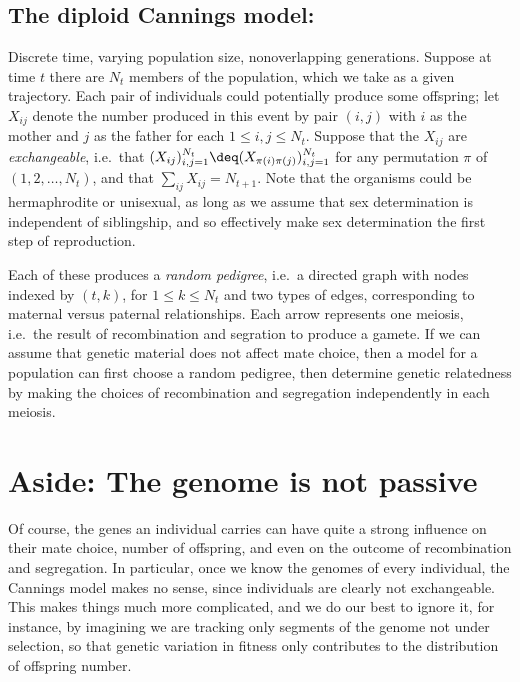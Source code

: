 \subsection{The diploid Cannings model:}
Discrete time, varying population size, nonoverlapping generations.
Suppose at time $t$ there are $N_t$ members of the population,
which we take as a given trajectory.
Each pair of individuals could potentially produce some offspring;
let $X_{ij}$ denote the number produced in this event by pair $(i,j)$ with $i$ as the mother and $j$ as the father for each $1 \le i,j \le N_{t}$.
Suppose that the $X_{ij}$ are \emph{exchangeable},
i.e.\ that $(X_{ij})_{i,j=1}^{N_{t}} \deq (X_{\pi(i)\pi(j)})_{i,j=1}^{N_{t}}$ for any permutation $\pi$ of $(1,2,\ldots,N_{t})$,
and that $\sum_{ij} X_{ij} = N_{t+1}$.
Note that the organisms could be hermaphrodite or unisexual,
as long as we assume that sex determination is independent of siblingship,
and so effectively make sex determination the first step of reproduction.


Each of these produces a \emph{random pedigree}, 
i.e.\ a directed graph with nodes indexed by $(t,k)$, for $1 \le k \le N_t$
and two types of edges, corresponding to maternal versus paternal relationships.
Each arrow represents one meiosis, i.e.\ the result of recombination and segration to produce a gamete.
If we can assume that genetic material does not affect mate choice,
then a model for a population can first choose a random pedigree,
then determine genetic relatedness by making the choices of recombination and segregation
independently in each meiosis.



\section*{Aside: The genome is not passive}

Of course, the genes an individual carries can have quite a strong influence
on their mate choice, number of offspring, and even on the outcome of recombination and segregation.
In particular, once we know the genomes of every individual, the Cannings model makes no sense,
since individuals are clearly not exchangeable.
This makes things much more complicated,
and we do our best to ignore it,
for instance, by imagining we are tracking only segments of the genome not under selection,
so that genetic variation in fitness only contributes to the distribution of offspring number.



